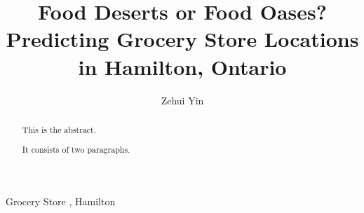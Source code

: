 \documentclass[preprint, 3p,
authoryear]{elsarticle} %
\begin{document}
\begin{frontmatter}

  \title{Food Deserts or Food Oases? Predicting Grocery Store Locations
in Hamilton, Ontario}
    \author[sees]{Zehui Yin%
  }
  
  \begin{abstract}
  This is the abstract.

  It consists of two paragraphs.
  \end{abstract}
    \begin{keyword}
    Grocery Store \sep 
    Hamilton
  \end{keyword}
  
 \end{frontmatter}
\end{document}
